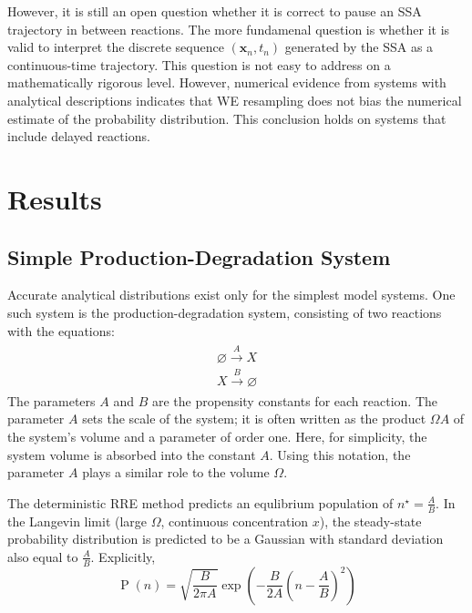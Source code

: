 \documentclass[english,letterpaper,12pt]{report}
\renewcommand{\vec}[1]{\ensuremath{\mathbf{#1}}}
\DeclareMathOperator{\Prob}{P}
\begin{document}
\begin{doublespacing}
However, it is still an open question whether it is correct to pause an SSA trajectory in between reactions. The more fundamenal question is whether it is valid to interpret the discrete sequence $(\vec{x}_n, t_n)$ generated by the SSA as a continuous-time trajectory. This question is not easy to address on a mathematically rigorous level. However, numerical evidence from systems with analytical descriptions indicates that WE resampling does not bias the numerical estimate of the probability distribution. This conclusion holds on systems that include delayed reactions.



\chapter{Results} %
\label{chp:results}

\section{Simple Production-Degradation System} %
\label{sec:simple-pd}

Accurate analytical distributions exist only for the simplest model systems. One such system is the production-degradation system, consisting of two reactions with the equations:
\begin{align}
    \begin{gathered}
        \varnothing \xrightarrow{A} X \\
        X \xrightarrow {B} \varnothing
    \end{gathered}
    \label{eq:prod-deg-rxn}
\end{align}
The parameters $A$ and $B$ are the propensity constants for each reaction. The parameter $A$ sets the scale of the system; it is often written as the product $\Omega A$ of the system's volume and a parameter of order one. Here, for simplicity, the system volume is absorbed into the constant $A$. Using this notation, the parameter $A$ plays a similar role to the volume $\Omega$.

The deterministic RRE method predicts an equlibrium population of $n^\star = \frac{A}{B}$. In the Langevin limit (large $\Omega$, continuous concentration $x$), the steady-state probability distribution is predicted to be a Gaussian with standard deviation also equal to $\frac{A}{B}$. Explicitly,
\begin{equation}
    \Prob(n) = \sqrt{\frac{B}{2\pi A}}\exp\left( -\frac{B}{2 A} \left( n - \frac{A}{B} \right)^2  \right)
    \label{eq:prod-deg-dist}
\end{equation}


\end{doublespacing}
\end{document}
